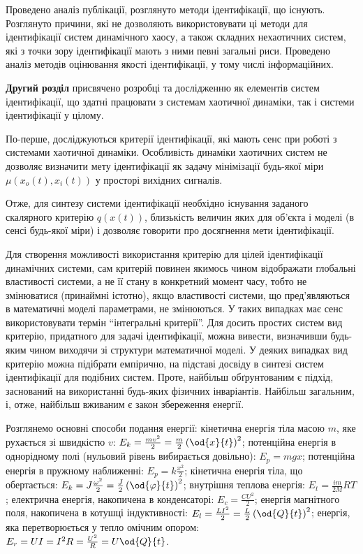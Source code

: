 \documentclass[a4paper,13pt]{atuaref}
\begin{document}
Проведено аналіз публікації, розглянуто методи ідентифікації, що існують.
Розглянуто причини, які не дозволяють використовувати ці методи для
ідентифікації систем динамічного хаосу, а також складних нехаотичних систем, які
з точки зору ідентифікації мають з ними певні загальні риси.  Проведено аналіз
методів оцінювання якості ідентифікації, у тому числі інформаційних.



\textbf{Другий розділ}
присвячено розробці та дослідженню як елементів систем ідентифікації,
що здатні працювати з системам хаотичної динаміки, так і системи ідентифікації у цілому.

По-перше, досліджуються критерії ідентифікації,
які мають сенс при роботі з системами
хаотичної динаміки.
Особливість динаміки хаотичних систем не дозволяє визначити мету ідентифікації
як задачу мінімізації будь-якої міри
$\mu (x_o (t), x_i (t))$ у просторі вихідних сигналів.%

Отже, для синтезу системи ідентифікації необхідно існування заданого скалярного
критерію $q(x(t))$, близькість величин яких для об'єкта і моделі (в сенсі
будь-якої міри) і дозволяє говорити про досягнення мети ідентифікації.

Для створення можливості використання критерію для цілей ідентифікації
динамічних системи, сам критерій повинен якимось чином відображати глобальні
властивості системи, а не її стану в конкретний момент часу, тобто не
змінюватися (принаймні істотно), якщо властивості системи, що пред'являються в
математичні моделі параметрами, не змінюються. У таких випадках має сенс
використовувати термін ``інтегральні критерії''.
Для досить простих систем вид критерію, придатного для задачі ідентифікації,
можна вивести, визначивши будь-яким чином виходячи зі структури математичної
моделі. У деяких випадках вид критерію можна підібрати емпірично, на
підставі досвіду в синтезі систем ідентифікації для подібних систем. Проте,
найбільш обґрунтованим є підхід, заснований на використанні будь-яких фізичних
інваріантів.
Найбільш загальним, і, отже, найбільш вживаним є закон збереження енергії.

Розглянемо основні способи подання енергії:
кінетична енергія тіла масою $m$, яке рухається зі швидкістю $v$:
$E_k = \frac{mv^2}{2} = \frac{m}{2} \left( \od{x}{t} \right)^2$;
потенційна енергія в однорідному полі (нульовий рівень вибирається довільно):
$E_p = m g x$;
потенційна енергія в пружному наближенні:
$E_p = k \frac{x^2}{2}$;
кінетична енергія тіла, що обертається:
$E_k = J \frac{\omega^2}{2} = \frac{J}{2} \left( \od{\varphi}{t} \right)^2$;
внутрішня теплова енергія:
$E_t = \frac{im}{2M} RT$;
електрична енергія, накопичена в конденсаторі:
$E_c = \frac{C U^2}{2}$;
енергія магнітного поля, накопичена в котушці індуктивності:
$E_l = \frac{L I^2}{2} = \frac{L}{2} \left( \od{Q}{t}\right)^2$;
енергія, яка перетворюється у тепло омічним опором:
$E_r = U I = I^2 R = \frac{U^2}{R} = U \od{Q}{t}$.
\end{document}
